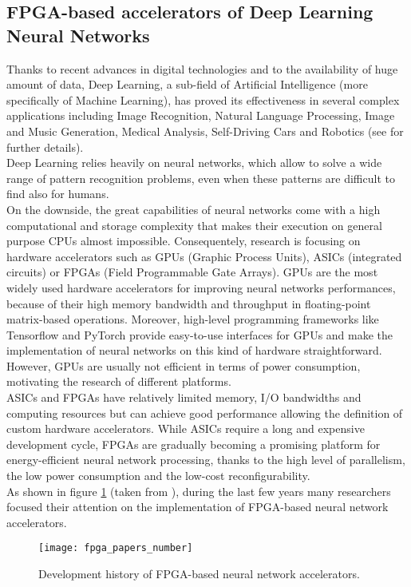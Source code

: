 \documentclass[11pt,a4paper]{article}
\begin{document}
\subsection{FPGA-based accelerators of Deep Learning Neural Networks}
Thanks to recent advances in digital technologies and to the availability of huge amount of data, Deep Learning, a sub-field of Artificial Intelligence (more specifically of Machine Learning), has proved its effectiveness in several complex applications including Image Recognition, Natural Language Processing, Image and Music Generation, Medical Analysis, Self-Driving Cars and Robotics (see \cite{deep_learning_book} for further details).\\
Deep Learning relies heavily on neural networks, which allow to solve a wide range of pattern recognition problems, even when these patterns are difficult to find also for humans.\\
On the downside, the great capabilities of neural networks come with a high computational and storage complexity that makes their execution on general purpose CPUs almost impossible. Consequentely, research is focusing on hardware accelerators such as GPUs (Graphic Process Units), ASICs (integrated circuits) or FPGAs (Field Programmable Gate Arrays). GPUs are the most widely used hardware accelerators for improving neural networks performances, because of their high memory bandwidth and throughput in floating-point matrix-based operations. Moreover, high-level programming frameworks like Tensorflow and PyTorch provide easy-to-use interfaces for GPUs and make the implementation of neural networks on this kind of hardware straightforward. However, GPUs are usually not efficient in terms of power consumption, motivating the research of different platforms.\\
ASICs and FPGAs have relatively limited memory, I/O bandwidths and computing resources but can achieve good performance allowing the definition of custom hardware accelerators. While ASICs require a long and expensive development cycle, FPGAs are gradually becoming a promising platform for energy-efficient neural network processing, thanks to the high level of parallelism, the low power consumption and the low-cost reconfigurability.\\
As shown in figure \ref{fig:fpga_papers_number} (taken from \cite{wang_survey_2018}), during the last few years many researchers focused their attention on the implementation of FPGA-based neural network accelerators.
\begin{figure}[h]
    \centering	
    \texttt{[image: fpga\_papers\_number]}
    \caption{Development history of FPGA-based neural network accelerators.}
    \label{fig:fpga_papers_number}
\end{figure}
\end{document}
